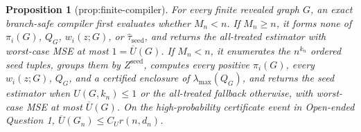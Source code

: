 \documentclass{article}
\newtheorem{proposition}{Proposition}
\begin{document}
\begin{proposition}[prop:finite-compiler]\label{prop:finite-compiler}
For every finite revealed graph \(G\), an exact branch-safe compiler first evaluates whether \(M_n<n\). If \(M_n\ge n\), it forms none of \(\pi_i(G)\), \(Q_G\), \(w_i(z;G)\), or \(\widehat\tau_{\mathrm{seed}}\), and returns the all-treated estimator with worst-case MSE at most \(1=\overline U(G)\). If \(M_n<n\), it enumerates the \(n^{k_n}\) ordered seed tuples, groups them by \(Z^{\mathrm{seed}}\), computes every positive \(\pi_i(G)\), every \(w_i(z;G)\), \(Q_G\), and a certified enclosure of \(\lambda_{\max}(Q_G)\), and returns the seed estimator when \(U(G,k_n)\le1\) or the all-treated fallback otherwise, with worst-case MSE at most \(\overline U(G)\). On the high-probability certificate event in Open-ended Question 1, \(\overline U(G_n)\le C_Ur(n,d_n)\).
\end{proposition}
\end{document}
